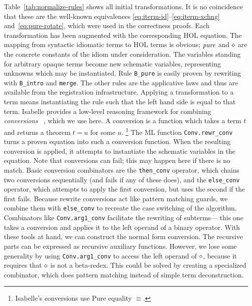 Table~\ref{tab:normalize-rules} shows all initial transformations.
It is no coincidence that these are the well-known equivalences
\eqref{eq:iterm-id}--\eqref{eq:iterm-xchng} and~\eqref{eq:pure-rotate}, which
were used in the correctness proofs.
Each transformation has been augmented with the corresponding HOL equation.
The mapping from syntactic idiomatic terms to HOL terms is obvious;
$\operatorname{\mathit{pure}}$ and $\diamond$ are the concrete constants of the idiom under consideration.
The variables standing for arbitrary opaque terms become new schematic variables,
representing unknowns which may be instantiated.
Rule \texttt{B\_pure} is easily proven by rewriting with \texttt{B\_intro} and
\texttt{merge}.
The other rules are the applicative laws and thus are available from the
registration infrastructure.
Applying a transformation to a term means instantiating the rule such that the
left hand side is equal to that term.
Isabelle provides a low-level reasoning framework for combining \emph{conversions}~
\cite{paulson83}, which we use here.
A conversion is a function which takes a term $t$ and returns a theorem
$t = u$ for some $u$.%
\footnote{Isabelle's conversions use Pure equality $\equiv$.}
The ML function \verb+Conv.rewr_conv+ turns a proven equation into such a
conversion function.
When the resulting conversion is applied, it attempts to instantiate the
schematic variables in the equation.
Note that conversions can fail; this may happen here if there is no match.
Basic conversion combinators are the \verb+then_conv+ operator, which chains
two conversions sequentially (and fails if any of these does),
and the \verb+else_conv+ operator, which attempts to apply the first conversion,
but uses the second if the first fails.
Because rewrite conversions act like pattern matching guards, we combine them
with \verb+else_conv+ to recreate the case switching of the algorithm.
Combinators like \verb+Conv.arg1_conv+ facilitate the rewriting of subterms---%
this one takes a conversion and applies it to the left operand of a binary operator.
With these tools at hand, we can construct the normal form conversion.
The recursive parts can be expressed as recursive auxiliary functions.
However, we lose some generality by using \verb+Conv.arg1_conv+ to access
the left operand of $\diamond$, because it requires that $\diamond$ is not a beta-redex.
This could be solved by creating a specialized combinator, which does pattern
matching instead of simple term deconstruction.

